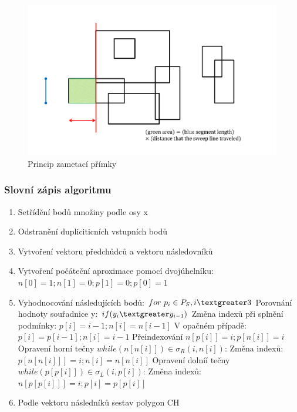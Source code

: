 \documentclass[a4paper,11pt,twoside]{article}
\begin{document}
\vspace{0.2cm}
\begin{figure}[hbt!] 
\begin{center}
\includegraphics[width=15cm]{pictures/sweep.png} 
\caption[Princip zametací přímky]{Princip zametací přímky \cite{sweep}}
\label{fig:quick}
\end{center}
\end{figure}
\vspace{-0.4cm}

\subsubsection{Slovní zápis algoritmu}
\begin{enumerate}
\item Setřídění bodů množiny podle osy x 
\item Odstranění dupliciticních vstupních bodů
\item Vytvoření vektoru předchůdců a vektoru následovníků
\item Vytvoření počáteční aproximace pomocí dvojúhelníku:  $ n[0] = 1; n[1] = 0; p[1] = 0;  p[0] = 1$
\item Vyhodnocování následujících bodů: $ for~ p_i \in P_S, i \textgreater 3$
\subitem Porovnání hodnoty souřadnice y: $ if (y_i \textgreater y_{i-1})  $
\subsubitem Změna indexů při splnění podmínky: $ p[i] = i-1; n[i] = n[i-1]$
\subsubitem V opačném případě: $ p[i] = p[i-1]; n[i] = i-1$
\subitem Přeindexování $ n[p[i]] = i; p[n[i]] = i  $
\subitem Opravení horní tečny $ while (n[n[i]]) \in \sigma_R (i, n[i]) $:
\subsubitem Změna indexů: $ p[n[n[i]]] = i; n[i] = n[n[i]]$
\subitem  Opravení dolníí tečny $ while (p[p[i]]) \in \sigma_L (i, p[i]) $:
\subsubitem Změna indexů: $ n[p[p[i]]] = i; p[i] = p[p[i]]$
\item Podle vektoru následníků sestav polygon CH
\end{enumerate}
\end{document}
